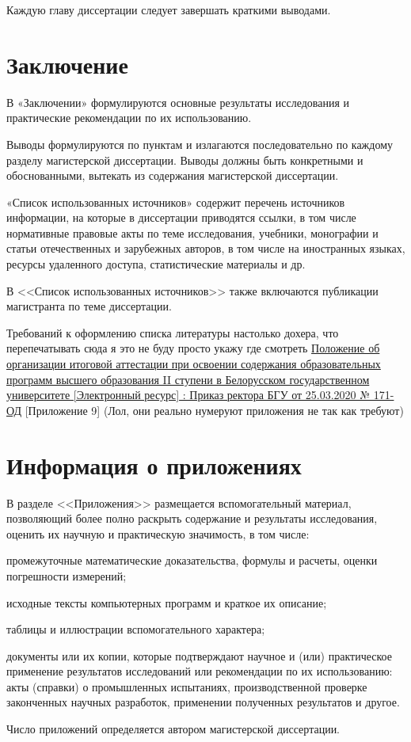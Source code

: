 \documentclass{mpaper}
\begin{document}
    Каждую главу диссертации следует завершать краткими выводами.
    \chapter*{Заключение}
    В «Заключении» формулируются основные результаты исследования и практические рекомендации по их использованию.

    Выводы формулируются по пунктам и излагаются последовательно по каждому разделу магистерской диссертации. Выводы должны быть конкретными и обоснованными, вытекать из содержания магистерской диссертации.

    «Список использованных источников» содержит перечень источников информации, на которые в диссертации приводятся ссылки, в том числе нормативные правовые акты по теме исследования, учебники, монографии и статьи отечественных и зарубежных авторов, в том числе на иностранных языках, ресурсы удаленного доступа, статистические материалы и др.

    В <<Список использованных источников>> также включаются публикации магистранта по теме диссертации.
    \begin{thebibliography}{9}
         Требований к оформлению списка литературы настолько дохера, что перепечатывать сюда я это не буду просто укажу где смотреть
         \href{https://rci.bsu.by/images/docs/prikaz_polozhenie_ob_attestatsi_magistratura_2020.pdf}{Положение об организации итоговой аттестации при освоении содержания образовательных программ высшего образования II ступени в Белорусском государственном университете [Электронный ресурс] : Приказ ректора БГУ от 25.03.2020 № 171-ОД} [Приложение 9] (Лол, они реально нумеруют приложения не так как требуют)
    \end{thebibliography}
    \appendix
    \chapter{Информация о приложениях}
    В разделе <<Приложения>> размещается вспомогательный материал, позволяющий более полно раскрыть содержание и результаты исследования, оценить их научную и практическую значимость, в том числе:

    промежуточные математические доказательства, формулы и расчеты, оценки погрешности измерений;

    исходные тексты компьютерных программ и краткое их описание;

    таблицы и иллюстрации вспомогательного характера;

    документы или их копии, которые подтверждают научное и (или) практическое применение результатов исследований или рекомендации по их использованию: акты (справки) о промышленных испытаниях, производственной проверке законченных научных разработок, применении полученных результатов и другое.

    Число приложений определяется автором магистерской диссертации.
\end{document}
